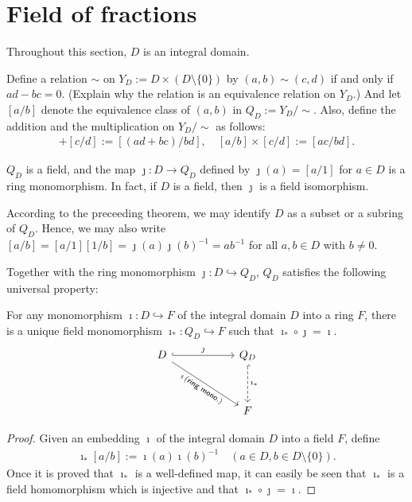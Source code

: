 \section{Field of fractions}

Throughout this section, $D$ is an integral domain.

Define a relation $\sim$ on $Y_D:= D\times(D\setminus\{0\})$ by $(a, b)\sim (c, d)$ if and only if $ad-bc=0$. \color{brown}(Explain why the relation is an equivalence relation on $Y_D$.) \color{black}
And let $[a/b]$ denote the equivalence class of $(a, b)$ in $Q_D:=Y_D/\sim$.
Also, define the addition and the multiplication on $Y_D/\sim$ as follows:
\begin{align*}
    [a/b]+[c/d]:=[(ad+bc)/bd],\quad [a/b]\times[c/d]:=[ac/bd].
\end{align*}

\begin{thm}
    $Q_D$ is a field, and the map $\jmath: D\rightarrow Q_D$ defined by $\jmath(a)=[a/1]$ for $a\in D$ is a ring monomorphism.
    In fact, if $D$ is a field, then $\jmath$ is a field isomorphism.
\end{thm}
According to the preceeding theorem, we may identify $D$ as a subset or a subring of $Q_D$.
Hence, we may also write $[a/b]=[a/1][1/b]=\jmath(a)\jmath(b)^{-1}=ab^{-1}$ for all $a, b\in D$ with $b\neq 0$.

Together with the ring monomorphism $\jmath: D\hookrightarrow Q_D$, $Q_D$ satisfies the following universal property:
\begin{thm}
    For any monomorphism $\imath: D\hookrightarrow F$ of the integral domain $D$ into a ring $F$, there is a unique field monomorphism $\imath_*: Q_D\hookrightarrow F$ such that $\imath_*\circ\jmath=\imath$.
    \begin{equation*}
    \begin{tikzcd}[row sep=1.2cm, column sep=2.0cm]
        D\arrow[r, "\jmath", hook]
        \arrow[dr, sloped, "\imath\,(\textsf{ring mono.})"' hook]
        &
        Q_D\arrow[d, "\imath_*", hook, dashed]
        \\
        &
        F
    \end{tikzcd}
    \end{equation*}
\end{thm}
\begin{proof}
    Given an embedding $\imath$ of the integral domain $D$ into a field $F$, define
    \begin{align*}
        \imath_*[a/b]:=\imath(a)\imath(b)^{-1}\quad(a\in D, b\in D\setminus\{0\}).
    \end{align*}
    Once it is proved that $\imath_*$ is a well-defined map, it can easily be seen that $\imath_*$ is a field homomorphism which is injective and that $\imath_*\circ\jmath=\imath$.
\end{proof}